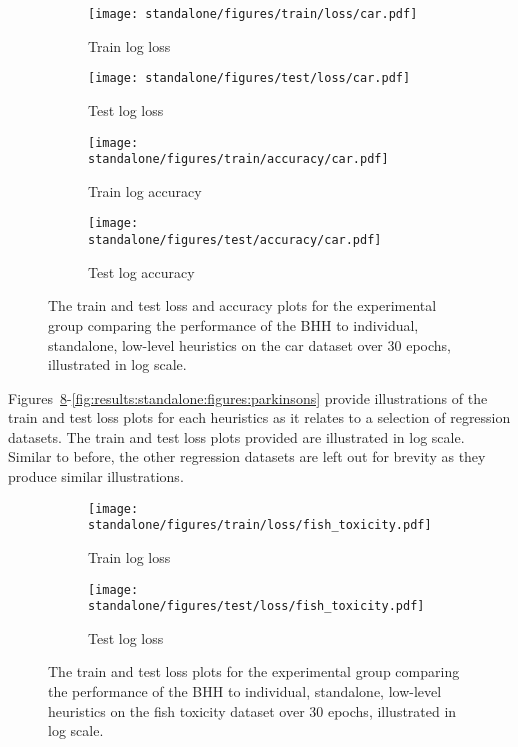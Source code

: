 \begin{figure}[htbp]
	\begin{subfigure}{0.5\textwidth}
		\centering
		\texttt{[image: standalone/figures/train/loss/car.pdf]}
		\caption{Train log loss}
		\label{fig:results:standalone:figures:loss:train:car}
	\end{subfigure}
	\begin{subfigure}{0.5\textwidth}
		\centering
		\texttt{[image: standalone/figures/test/loss/car.pdf]}
		\caption{Test log loss}
		\label{fig:results:standalone:figures:loss:test:car}
	\end{subfigure}
	\par\bigskip
	\begin{subfigure}{0.5\textwidth}
		\centering
		\texttt{[image: standalone/figures/train/accuracy/car.pdf]}
		\caption{Train log accuracy}
		\label{fig:results:standalone:figures:accuracy:train:car}
	\end{subfigure}
	\begin{subfigure}{0.5\textwidth}
		\centering
		\texttt{[image: standalone/figures/test/accuracy/car.pdf]}
		\caption{Test log accuracy}
		\label{fig:results:standalone:figures:accuracy:test:car}
	\end{subfigure}
	\par\bigskip
	\caption{The train and test loss and accuracy plots for the experimental group comparing the performance of the \acs{BHH} to individual, standalone, low-level heuristics on the car dataset over 30 epochs, illustrated in log scale.}
	\label{fig:results:standalone:figures:car}
\end{figure}

Figures~\ref{fig:results:standalone:figures:fish_toxicity}-\ref{fig:results:standalone:figures:parkinsons} provide illustrations of the train and test loss plots for each heuristics as it relates to a selection of regression datasets. The train and test loss plots provided are illustrated in log scale. Similar to before, the other regression datasets are left out for brevity as they produce similar illustrations.

\begin{figure}[htbp]
	\begin{subfigure}{0.5\textwidth}
		\centering
		\texttt{[image: standalone/figures/train/loss/fish\_toxicity.pdf]}
		\caption{Train log loss}
		\label{fig:results:standalone:figures:loss:train:fish_toxicity}
	\end{subfigure}
	\begin{subfigure}{0.5\textwidth}
		\centering
		\texttt{[image: standalone/figures/test/loss/fish\_toxicity.pdf]}
		\caption{Test log loss}
		\label{fig:results:standalone:figures:loss:test:fish_toxicity}
	\end{subfigure}
	\par\bigskip
	\caption{The train and test loss plots for the experimental group comparing the performance of the \acs{BHH} to individual, standalone, low-level heuristics on the fish toxicity dataset over 30 epochs, illustrated in log scale.}
	\label{fig:results:standalone:figures:fish_toxicity}
\end{figure}


